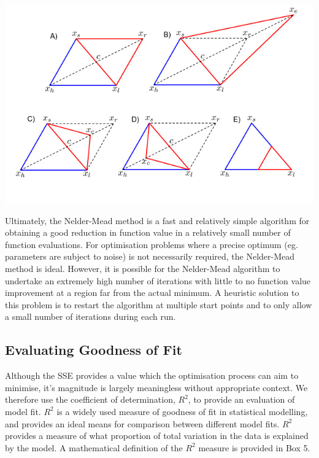 \documentclass[11pt, a4paper, oneside,titlepage]{article}
\begin{document}
\begin{framed}
\begin{center}
  \includegraphics[width=15cm]{nelder.png}
\end{center}

Ultimately, the Nelder-Mead method is a fast and relatively simple
algorithm for obtaining a good reduction in function value in a
relatively small number of function evaluations. For optimisation
problems where a precise optimum (eg. parameters are subject to noise)
is not necessarily required, the Nelder-Mead method is ideal. However, it is possible for the
Nelder-Mead algorithm to undertake an extremely high number of
iterations with little to no function value improvement at a region
far from the actual minimum. A heuristic solution to this problem is
to restart the algorithm at multiple start points and to only allow a
small number of iterations during each run.\cite{nelder,singer}
 
\end{framed}

\subsection{Evaluating Goodness of Fit}
Although the SSE provides a value which the optimisation process can
aim to minimise, it's magnitude is largely meaningless without
appropriate context. We therefore use the coefficient of
determination, $R^2$, to provide an evaluation of model fit. $R^2$ is
a widely used measure of goodness of fit in statistical modelling, and
provides an ideal means for comparison between different model
fits. $R^2$ provides a measure of what proportion of total variation
in the data is explained by the model. A mathematical definition of
the $R^2$ measure is provided in Box 5.
\end{document}
